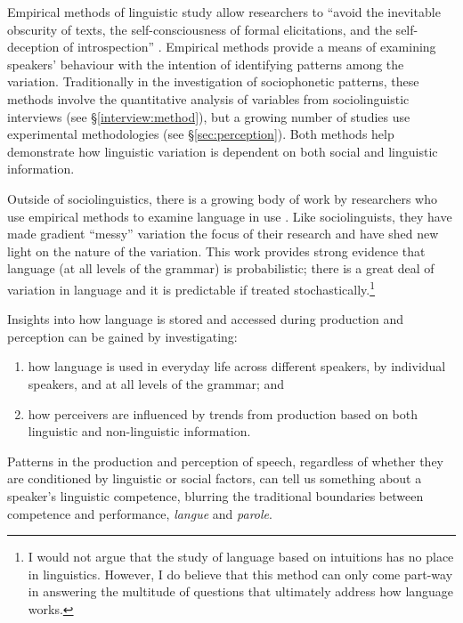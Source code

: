 Empirical methods of linguistic study allow researchers to ``avoid the inevitable obscurity of texts, the self-con\-scious\-ness of formal elicitations, and the self-decep\-tion of introspection'' \citep[xix]{labov1972sociolingpatterns}. Empirical methods provide a means of examining speakers' behaviour with the intention of identifying patterns among the variation. Traditionally in the investigation of sociophonetic patterns, these methods involve the quantitative analysis of variables from sociolinguistic interviews (see \S \ref{interview:method}), but a growing number of studies use experimental methodologies (see \S \ref{sec:perception}). Both methods help demonstrate how linguistic variation is dependent on both social and linguistic information.


Outside of sociolinguistics, there is a growing body of work by researchers who use empirical methods to examine language in use \citep{bodetal2003}. Like sociolinguists, they have made gradient ``messy'' variation the focus of their research and have shed new light on the nature of the variation. This work provides strong evidence that language (at all levels of the grammar) is probabilistic; there is a great deal of variation in language and it is predictable if treated stochastically.\footnote{I would not argue that the study of language based on intuitions has no place in linguistics. However, I do believe that this method can only come part-way in answering the multitude of questions that ultimately address how language works.}

Insights into how language is stored and accessed during production and perception can be gained by investigating: \nocite{saussure1916}  

\begin{enumerate}
	\item how language is used in everyday life across different speakers, by individual speakers, and at all levels of the grammar; and
	\item how perceivers are influenced by trends from production based on both linguistic and non-linguistic information.
\end{enumerate}

\noindent Patterns in the production and perception of speech, regardless of whether they are conditioned by linguistic or social factors, can tell us something about a speaker's linguistic competence, blurring the traditional boundaries between competence and performance, \textit{langue} and \textit{parole}. 



